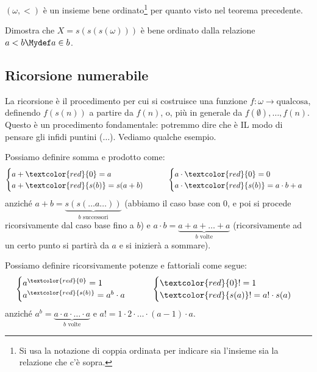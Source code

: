 \documentclass[11pt]{scrartcl}
\begin{document}
\begin{example}
	$(\omega, <)$ è un insieme bene ordinato\footnote{Si usa la notazione di coppia ordinata per indicare sia l'insieme sia la relazione che c'è sopra.} per quanto visto nel teorema precedente.
\end{example}

\begin{exercise}
	Dimostra che $X = s(s(s(\omega)))$ è bene ordinato dalla relazione $a < b \Mydef a \in b$.
\end{exercise}

\begin{soln}

\end{soln}

\subsection{Ricorsione numerabile}
La ricorsione è il procedimento per cui si costruisce una funzione $f : \omega \rightarrow \text{qualcosa}$, definendo $f(s(n))$ a partire da $f(n)$, o,
più in generale da $f(\emptyset),\ldots,f(n)$. Questo è un procedimento fondamentale: potremmo dire che è IL modo di pensare gli infidi puntini ($\ldots$). Vediamo qualche esempio.

\begin{example}
	Possiamo definire somma e prodotto come:
	\[ \begin{cases}
		a + \textcolor{red}{0} = a \\
		a + \textcolor{red}{s(b)} = s(a + b)
	\end{cases}
	\qquad
	\begin{cases}
		a \cdot \textcolor{red}{0} = 0\\
		a \cdot \textcolor{red}{s(b)} = a \cdot b + a
	\end{cases}
		\]
	anziché $a + b = \underbrace{s(s(\ldots a \ldots))}_{\text{$b$ successori}}$ (abbiamo il caso base con 0, e poi si procede ricorsivamente dal caso base fino a $b$) e $a \cdot b = \underbrace{a + a + \ldots + a}_{\text{$b$ volte}}$ (ricorsivamente ad un certo 
	punto si partirà da $a$ e si inizierà a sommare).
\end{example}

\begin{example}
	Possiamo definire ricorsivamente potenze e fattoriali come segue:
	\[ \begin{cases}
		a^{\textcolor{red}{0}} = 1\\
		a^{\textcolor{red}{s(b)}} = a^b \cdot a
	\end{cases}
	\qquad
	\begin{cases}
		\textcolor{red}{0}! = 1\\
		\textcolor{red}{s(a)}! = a! \cdot s(a)
	\end{cases}
		\]
	anziché $a^b = \underbrace{a \cdot a \cdot \ldots \cdot a}_{\text{$b$ volte}}$ e $a! = 1 \cdot 2 \cdot \ldots \cdot (a - 1) \cdot a$.
\end{example}
\end{document}
